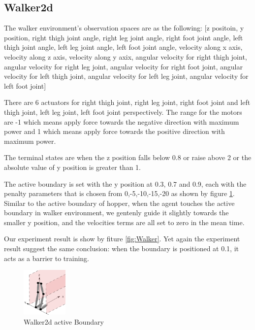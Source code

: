 \documentclass[journal]{IEEEtran}
\begin{document}
\subsection{Walker2d}
The walker environment's observation spaces are as the following: [z positoin, y position, right thigh joint angle, right leg joint angle, right foot joint angle, left thigh joint angle, left leg joint angle, left foot joint angle, velocity along x axis, velocity along z axis, velocity along y axix, angular velocity for right thigh joint, angular velocity for right leg joint, angular velocity for right foot joint, angular velocity for left thigh joint, angular velocity for left leg joint, angular velocity for left foot joint]

There are 6 actuators for right thigh joint, right leg joint, right foot joint and left thigh joint, left leg joint, left foot joint perspectively. The range for the motors are -1 which means apply force towards the negative direction with maximum power and 1 which means apply force towards the positive direction with maximum power.

The terminal states are when the z position falls below 0.8 or raise above 2 or the absolute value of y position is greater than 1.

The active boundary is set with the y position at 0.3, 0.7 and 0.9, each with the penalty parameters that is chosen from 0,-5,-10,-15,-20 as shown by figure \ref{fig:walkerPB}. Similar to the active boundary of hopper, when the agent touches the active boundary in walker environment, we gentenly guide it slightly towards the smaller y position, and the velocities terms are all set to zero in the mean time.

Our experiment result is show by fiture \ref{fig:Walker}. Yet again the experiment result suggest the same conclusion: when the boundary is positioned at 0.1, it acts as a barrier to training.

\begin{figure}
     \centering
      \includegraphics[width=0.2\textwidth]{walker.png}
      \caption{Walker2d active Boundary}
      \label{fig:walkerPB}
\end{figure}
\end{document}
